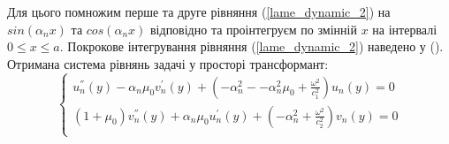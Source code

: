 Для цього помножим перше та друге рівняння (\ref{lame_dynamic_2}) на $sin(\alpha_n x)$ та $cos(\alpha_n x)$ відповідно та проінтегруєм по змінній $x$ на інтервалі $0 \le x \le a$.
Покрокове інтегрування рівняння (\ref{lame_dynamic_2}) наведено у ().
Отримана система рівнянь задачі у просторі трансформант:
\begin{equation}\label{transf_dynamic_2}
    \begin{cases}
        u_n^{''}(y) - \alpha_n \mu_0 v_n^{'}(y) + (-\alpha_n^2 - -\alpha_n^2 \mu_0 + \frac{\omega^2}{c_1^2}) u_n(y) = 0 \\
        (1 + \mu_0) v_n^{''}(y) + \alpha_n \mu_0 u_n^{'}(y) + (- \alpha_n^2 + \frac{\omega^2}{c_2^2}) v_n(y) = 0 \\
    \end{cases}
\end{equation}